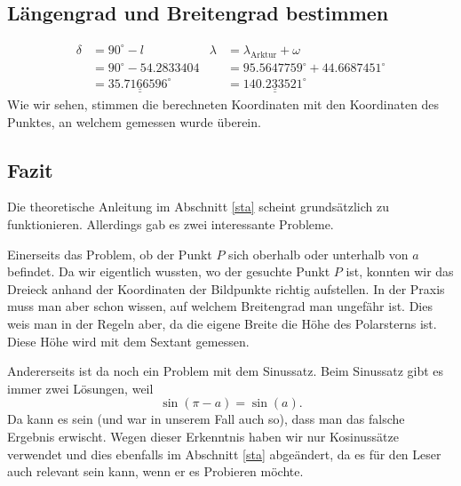 \subsection{Längengrad und Breitengrad bestimmen}

\begin{align*}
\delta &= 90^\circ - l &
	\lambda &= \lambda_{\text{Arktur}} + \omega \\
&= 90^\circ - 54.2833404 &
	&= 95.5647759^\circ + 44.6687451^\circ \\
&= \underline{\underline{35.7166596^\circ}} &
	&= \underline{\underline{140.233521^\circ}} 
\end{align*}
Wie wir sehen, stimmen die berechneten Koordinaten mit den Koordinaten des Punktes, an welchem gemessen wurde überein. 

\subsection{Fazit}
Die theoretische Anleitung im Abschnitt \ref{sta} scheint grundsätzlich zu funktionieren. 
Allerdings gab es zwei interessante Probleme.

Einerseits das Problem, ob der Punkt $P$ sich oberhalb oder unterhalb von $a$ befindet. 
Da wir eigentlich wussten, wo der gesuchte Punkt $P$ ist, konnten wir das Dreieck anhand der Koordinaten der Bildpunkte richtig aufstellen. 
In der Praxis muss man aber schon wissen, auf welchem Breitengrad man ungefähr ist. 
Dies weis man in der Regeln aber, da die eigene Breite die Höhe des Polarsterns ist.
Diese Höhe wird mit dem Sextant gemessen.

Andererseits ist da noch ein Problem mit dem Sinussatz.
Beim Sinussatz gibt es immer zwei Lösungen, weil \[ \sin(\pi-a)=\sin(a).\]
Da kann es sein (und war in unserem Fall auch so), dass man das falsche Ergebnis erwischt. 
Wegen dieser Erkenntnis haben wir nur Kosinussätze verwendet und dies ebenfalls im Abschnitt \ref{sta} abgeändert, da es für den Leser auch relevant sein kann, wenn er es Probieren möchte.




